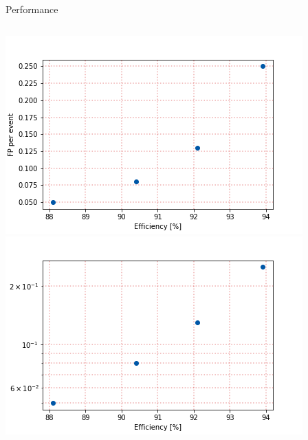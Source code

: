 \begin{frame}{Performance}
\begin{columns}
\includegraphics[width=\textwidth]{images/EffVsFP.png}
\includegraphics[width=\textwidth]{images/EffVsFP_semilog.png}
\end{columns}
\end{frame}
